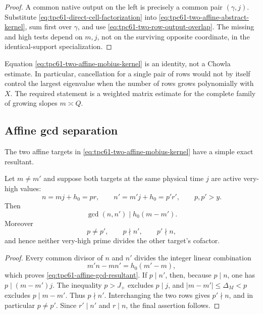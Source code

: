\begin{proof}
A common native output on the left is precisely a common pair
\((\gamma,j)\).  Substitute
\eqref{eq:tpc61-direct-cell-factorization} into
\eqref{eq:tpc61-two-affine-abstract-kernel}, sum first over \(\gamma\),
and use \eqref{eq:tpc61-two-row-output-overlap}.  The missing and high
tests depend on \(m,j\), not on the surviving opposite coordinate, in the
identical-support specialization.
\end{proof}

Equation \eqref{eq:tpc61-two-affine-mobius-kernel} is an identity, not a
Chowla estimate.  In particular, cancellation for a single pair of rows
would not by itself control the largest eigenvalue when the number of rows
grows polynomially with \(X\).  The required statement is a weighted
matrix estimate for the complete family of growing slopes \(m\asymp Q\).

\subsection{Affine gcd separation}

The two affine targets in
\eqref{eq:tpc61-two-affine-mobius-kernel} have a simple exact resultant.

\begin{lemma}
\label{lem:tpc61-affine-gcd-separation}
Let \(m\ne m'\) and suppose both targets at the same physical time \(j\)
are active very-high values:
\begin{equation}
 n=mj+h_0=pr,
 \qquad
 n'=m'j+h_0=p'r',
 \qquad p,p'>y.
 \label{eq:tpc61-two-high-factorizations}
\end{equation}
Then
\begin{equation}
 \boxed{\gcd(n,n')\mid h_0(m-m').}
 \label{eq:tpc61-affine-gcd-resultant}
\end{equation}
Moreover
\begin{equation}
 p\ne p',
 \qquad p\nmid n',
 \qquad p'\nmid n,
 \label{eq:tpc61-no-cross-high-prime}
\end{equation}
and hence neither very-high prime divides the other target's cofactor.
\end{lemma}

\begin{proof}
Every common divisor of \(n\) and \(n'\) divides the integer linear
combination
\[
 m'n-mn'=h_0(m'-m),
\]
which proves \eqref{eq:tpc61-affine-gcd-resultant}.  If \(p\mid n'\),
then, because \(p\mid n\), one has
\(p\mid(m-m')j\).  The inequality \(p>J_+\) excludes \(p\mid j\), and
\(|m-m'|\le\Delta_M<p\) excludes \(p\mid m-m'\).  Thus \(p\nmid n'\).
Interchanging the two rows gives \(p'\nmid n\), and in particular
\(p\ne p'\).  Since \(r'\mid n'\) and \(r\mid n\), the final assertion
follows.
\end{proof}

